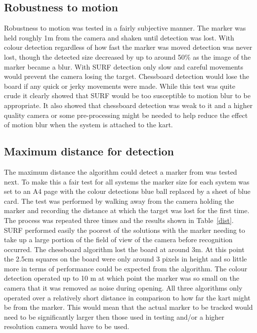 \subsection{Robustness to motion}
Robustness to motion was tested in a fairly subjective manner. The marker was held roughly 1m from the camera and shaken until detection was lost. With colour detection regardless of how fast the marker was moved detection was never lost, though the detected size decreased by up to around 50\% as the image of the marker became a blur. With SURF detection only slow and careful movements would prevent the camera losing the target. Chessboard detection would lose the board if any quick or jerky movements were made. While this test was quite crude it clearly showed that SURF would be too susceptible to motion blur to be appropriate. It also showed that chessboard detection was weak to it and a higher quality camera or some pre-processing might be needed to help reduce the effect of motion blur when the system is attached to the kart.

\subsection{Maximum distance for detection}
The maximum distance the algorithm could detect a marker from was tested next. To make this a fair test for all systems the marker size for each system was set to an A4 page with the colour detections blue ball replaced by a sheet of blue card. The test was performed by walking away from the camera holding the marker and recording the distance at which the target was lost for the first time. The process was repeated three times and the results shown in Table~\ref{dist}. SURF performed easily the poorest of the solutions with the marker needing to take up a large portion of the field of view of the camera before recognition occurred. The chessboard algorithm lost the board at around 3m. At this point the 2.5cm squares on the board were only around 3 pixels in height and so little more in terms of performance could be expected from the algorithm. The colour detection operated up to 10 m at which point the marker was so small on the camera that it was removed as noise during opening. All three algorithms only operated over a relatively short distance in comparison to how far the kart might be from the marker. This would mean that the actual marker to be tracked would need to be significantly larger then those used in testing and/or a higher resolution camera would have to be used.

